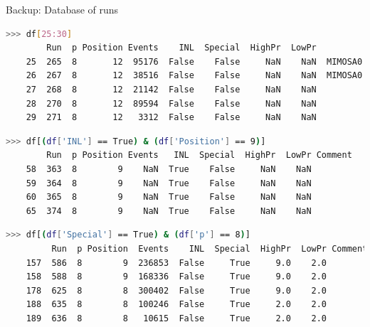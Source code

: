 \documentclass[xcolor = table]{beamer}
\begin{document}
\begin{frame}[fragile]{Backup: Database of runs}
  \vspace{0.3cm}
  \tiny
  \begin{lstlisting}[language=bash]
    >>> df[25:30]
        Run  p Position Events    INL  Special  HighPr  LowPr          Comment
    25  265  8       12  95176  False    False     NaN    NaN  MIMOSA0 missing
    26  267  8       12  38516  False    False     NaN    NaN  MIMOSA0 missing
    27  268  8       12  21142  False    False     NaN    NaN                 
    28  270  8       12  89594  False    False     NaN    NaN                 
    29  271  8       12   3312  False    False     NaN    NaN
  \end{lstlisting}
  \vspace{0.2cm}
  \begin{lstlisting}[language=bash]
    >>> df[(df['INL'] == True) & (df['Position'] == 9)]
        Run  p Position Events   INL  Special  HighPr  LowPr Comment
    58  363  8        9    NaN  True    False     NaN    NaN        
    59  364  8        9    NaN  True    False     NaN    NaN        
    60  365  8        9    NaN  True    False     NaN    NaN        
    65  374  8        9    NaN  True    False     NaN    NaN
  \end{lstlisting}
  \vspace{0.2cm}
  \begin{lstlisting}[language=bash]
    >>> df[(df['Special'] == True) & (df['p'] == 8)]
         Run  p Position  Events    INL  Special  HighPr  LowPr Comment
    157  586  8        9  236853  False     True     9.0    2.0        
    158  588  8        9  168336  False     True     9.0    2.0        
    178  625  8        8  300402  False     True     9.0    2.0        
    188  635  8        8  100246  False     True     2.0    2.0        
    189  636  8        8   10615  False     True     2.0    2.0
  \end{lstlisting}
\end{frame}
\end{document}
